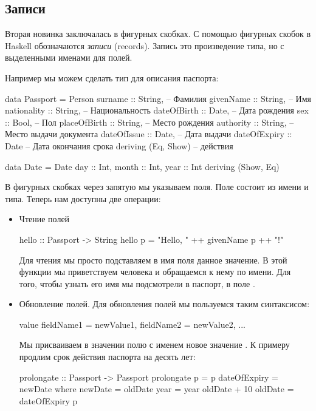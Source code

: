 \subsection{Записи}

Вторая новинка заключалась в фигурных скобках. С помощью фигурных скобок
в Haskell обозначаются \emph{записи} (records). Запись это произведение
типа, но с выделенными именами для полей.

Например мы можем сделать тип для описания паспорта:


\begin{code}
data Passport   = Person {
    surname         :: String,      -- Фамилия
    givenName       :: String,      -- Имя
    nationality     :: String,      -- Национальность
    dateOfBirth     :: Date,        -- Дата рождения
    sex             :: Bool,        -- Пол
    placeOfBirth    :: String,      -- Место рождения
    authority       :: String,      -- Место выдачи документа
    dateOfIssue     :: Date,        -- Дата выдачи
    dateOfExpiry    :: Date         -- Дата окончания срока
    } deriving (Eq, Show)           --      действия

data Date   = Date {
                day     :: Int,
                month   :: Int,
                year    :: Int
              } deriving (Show, Eq)
\end{code}

В фигурных скобках через запятую мы указываем поля. Поле состоит из
имени и типа. Теперь нам доступны две операции:

\begin{itemize}
\item
  Чтение полей


  \begin{code}
  hello :: Passport -> String
  hello p = "Hello, " ++ givenName p ++ "!"
  \end{code}

  Для чтения мы просто подставляем в имя поля данное значение. В этой
  функции мы приветствуем человека и обращаемся к нему по имени. Для
  того, чтобы узнать его имя мы подсмотрели в паспорт, в поле
  .
\item
  Обновление полей. Для обновления полей мы пользуемся таким
  синтаксисом:


  \begin{code}
  value { fieldName1 = newValue1, fieldName2 = newValue2, ... }
  \end{code}

  Мы присваиваем в значении  полю с именем 
  новое значение . К примеру продлим срок действия
  паспорта на десять лет:


  \begin{code}
  prolongate :: Passport -> Passport 
  prolongate p = p{ dateOfExpiry = newDate }
      where newDate = oldDate { year = year oldDate + 10 }
            oldDate = dateOfExpiry p      
  \end{code}
\end{itemize}

